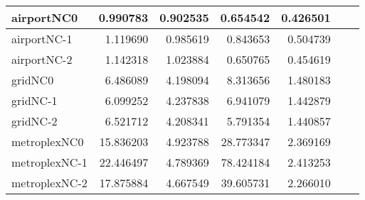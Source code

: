 \begin{longtable}{|l|r|r|r|r|r|r|}
airportNC0 & 0.990783 & 0.902535 & 0.654542 & 0.426501 \\ \hline
airportNC-1 & 1.119690 & 0.985619 & 0.843653 & 0.504739 \\ \hline
airportNC-2 & 1.142318 & 1.023884 & 0.650765 & 0.454619 \\ \hline
gridNC0 & 6.486089 & 4.198094 & 8.313656 & 1.480183 \\ \hline
gridNC-1 & 6.099252 & 4.237838 & 6.941079 & 1.442879 \\ \hline
gridNC-2 & 6.521712 & 4.208341 & 5.791354 & 1.440857 \\ \hline
metroplexNC0 & 15.836203 & 4.923788 & 28.773347 & 2.369169 \\ \hline
metroplexNC-1 & 22.446497 & 4.789369 & 78.424184 & 2.413253 \\ \hline
metroplexNC-2 & 17.875884 & 4.667549 & 39.605731 & 2.266010 \\ \hline
\end{longtable}
